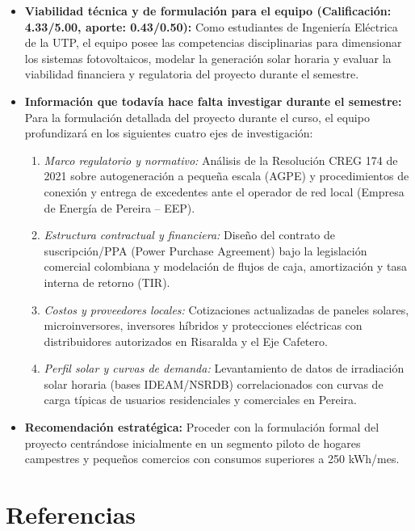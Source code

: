 \documentclass[11pt,a4paper]{article}
\begin{document}
\begin{itemize}[leftmargin=1.6em, label={\small\color{colorEco}}]
    \item \textbf{Viabilidad técnica y de formulación para el equipo (Calificación: 4.33/5.00, aporte: 0.43/0.50):} Como estudiantes de Ingeniería Eléctrica de la UTP, el equipo posee las competencias disciplinarias para dimensionar los sistemas fotovoltaicos, modelar la generación solar horaria y evaluar la viabilidad financiera y regulatoria del proyecto durante el semestre.
    
    \item \textbf{Información que todavía hace falta investigar durante el semestre:} Para la formulación detallada del proyecto durante el curso, el equipo profundizará en los siguientes cuatro ejes de investigación:
    \begin{enumerate}[label=\alph*)]
        \item \textit{Marco regulatorio y normativo:} Análisis de la Resolución CREG 174 de 2021 sobre autogeneración a pequeña escala (AGPE) y procedimientos de conexión y entrega de excedentes ante el operador de red local (Empresa de Energía de Pereira -- EEP).
        \item \textit{Estructura contractual y financiera:} Diseño del contrato de suscripción/PPA (Power Purchase Agreement) bajo la legislación comercial colombiana y modelación de flujos de caja, amortización y tasa interna de retorno (TIR).
        \item \textit{Costos y proveedores locales:} Cotizaciones actualizadas de paneles solares, microinversores, inversores híbridos y protecciones eléctricas con distribuidores autorizados en Risaralda y el Eje Cafetero.
        \item \textit{Perfil solar y curvas de demanda:} Levantamiento de datos de irradiación solar horaria (bases IDEAM/NSRDB) correlacionados con curvas de carga típicas de usuarios residenciales y comerciales en Pereira.
    \end{enumerate}
    
    \item \textbf{Recomendación estratégica:} Proceder con la formulación formal del proyecto centrándose inicialmente en un segmento piloto de hogares campestres y pequeños comercios con consumos superiores a 250 kWh/mes.
\end{itemize}

\section{Referencias}
\end{document}
